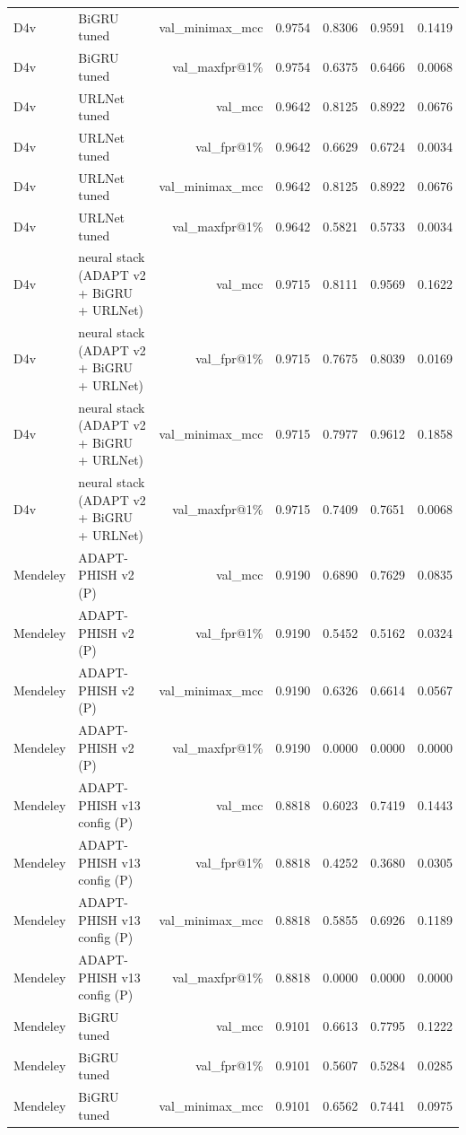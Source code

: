 \begin{table}[t]
\begin{tabular}{llrrrrr}
D4v & BiGRU tuned & val\_minimax\_mcc & 0.9754 & 0.8306 & 0.9591 & 0.1419 \\
D4v & BiGRU tuned & val\_maxfpr@1\% & 0.9754 & 0.6375 & 0.6466 & 0.0068 \\
D4v & URLNet tuned & val\_mcc & 0.9642 & 0.8125 & 0.8922 & 0.0676 \\
D4v & URLNet tuned & val\_fpr@1\% & 0.9642 & 0.6629 & 0.6724 & 0.0034 \\
D4v & URLNet tuned & val\_minimax\_mcc & 0.9642 & 0.8125 & 0.8922 & 0.0676 \\
D4v & URLNet tuned & val\_maxfpr@1\% & 0.9642 & 0.5821 & 0.5733 & 0.0034 \\
D4v & neural stack (ADAPT v2 + BiGRU + URLNet) & val\_mcc & 0.9715 & 0.8111 & 0.9569 & 0.1622 \\
D4v & neural stack (ADAPT v2 + BiGRU + URLNet) & val\_fpr@1\% & 0.9715 & 0.7675 & 0.8039 & 0.0169 \\
D4v & neural stack (ADAPT v2 + BiGRU + URLNet) & val\_minimax\_mcc & 0.9715 & 0.7977 & 0.9612 & 0.1858 \\
D4v & neural stack (ADAPT v2 + BiGRU + URLNet) & val\_maxfpr@1\% & 0.9715 & 0.7409 & 0.7651 & 0.0068 \\
Mendeley & ADAPT-PHISH v2 (P) & val\_mcc & 0.9190 & 0.6890 & 0.7629 & 0.0835 \\
Mendeley & ADAPT-PHISH v2 (P) & val\_fpr@1\% & 0.9190 & 0.5452 & 0.5162 & 0.0324 \\
Mendeley & ADAPT-PHISH v2 (P) & val\_minimax\_mcc & 0.9190 & 0.6326 & 0.6614 & 0.0567 \\
Mendeley & ADAPT-PHISH v2 (P) & val\_maxfpr@1\% & 0.9190 & 0.0000 & 0.0000 & 0.0000 \\
Mendeley & ADAPT-PHISH v13 config (P) & val\_mcc & 0.8818 & 0.6023 & 0.7419 & 0.1443 \\
Mendeley & ADAPT-PHISH v13 config (P) & val\_fpr@1\% & 0.8818 & 0.4252 & 0.3680 & 0.0305 \\
Mendeley & ADAPT-PHISH v13 config (P) & val\_minimax\_mcc & 0.8818 & 0.5855 & 0.6926 & 0.1189 \\
Mendeley & ADAPT-PHISH v13 config (P) & val\_maxfpr@1\% & 0.8818 & 0.0000 & 0.0000 & 0.0000 \\
Mendeley & BiGRU tuned & val\_mcc & 0.9101 & 0.6613 & 0.7795 & 0.1222 \\
Mendeley & BiGRU tuned & val\_fpr@1\% & 0.9101 & 0.5607 & 0.5284 & 0.0285 \\
Mendeley & BiGRU tuned & val\_minimax\_mcc & 0.9101 & 0.6562 & 0.7441 & 0.0975 \\

\end{tabular}
\end{table}
